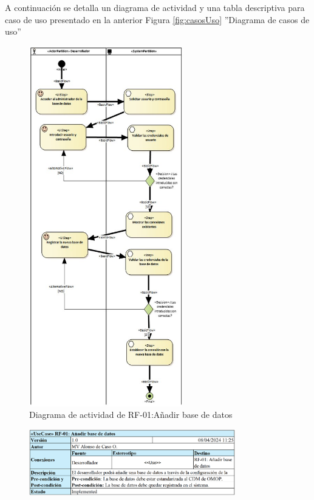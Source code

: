 A continuación se detalla un diagrama de actividad y una tabla descriptiva para caso de uso presentado en la anterior Figura \ref{fig:casosUso} ''Diagrama de casos de uso''

\begin{figure}[H]
    \centering
    \includegraphics[width=0.60\textwidth]{figures/FR01.jpg}
    \caption{Diagrama de actividad de RF-01:Añadir base de datos}
    \label{fig:FR01}
\end{figure}

\begin{figure}[H]
    \centering
    \includegraphics[width=0.80\textwidth]{tables/RF01tab.png}
    \label{table:RF01tab}
\end{figure}


